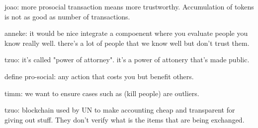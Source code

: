joao: more prosocial transaction means more trustworthy. Accumulation of tokens is not as good as number of transactions. 

anneke: it would be nice integrate a compoenent where you evaluate people you know really well. there's a lot of people that we know well but don't trust them.

tzuo: it's called "power of attorney". it's a power of attonery that's made public. 

define pro-social: any action that costs you but benefit others.

timm: we want to ensure cases such as (kill people) are outliers.

tzuo: blockchain used by UN to make accounting cheap and transparent for giving out stuff. They don't verify what is the items that are being exchanged. 













